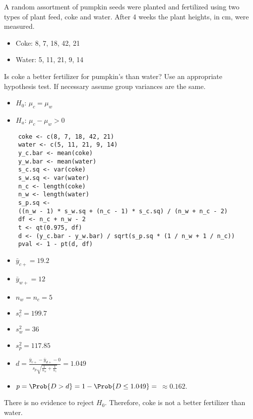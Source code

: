 \begin{Example}{}{}
    A random assortment of pumpkin seeds were planted and fertilized using two types of plant
    feed, coke and water. After 4 weeks the plant heights, in cm, were measured.
    \begin{itemize}
        \item Coke: 8, 7, 18, 42, 21
        \item Water: 5, 11, 21, 9, 14
    \end{itemize}
    Is coke a better fertilizer for pumpkin’s than water? Use an appropriate hypothesis test. If
    necessary assume group variances are the same.
    \begin{itemize}
        \item $ H_0 $: $ \mu_c=\mu_w $
        \item $ H_a $: $ \mu_c-\mu_w>0 $
    \end{itemize}
    \begin{verbatim}
    coke <- c(8, 7, 18, 42, 21)
    water <- c(5, 11, 21, 9, 14)
    y_c.bar <- mean(coke)
    y_w.bar <- mean(water)
    s_c.sq <- var(coke)
    s_w.sq <- var(water)
    n_c <- length(coke)
    n_w <- length(water)
    s_p.sq <-
    ((n_w - 1) * s_w.sq + (n_c - 1) * s_c.sq) / (n_w + n_c - 2)
    df <- n_c + n_w - 2
    t <- qt(0.975, df)
    d <- (y_c.bar - y_w.bar) / sqrt(s_p.sq * (1 / n_w + 1 / n_c))
    pval <- 1 - pt(d, df)
    \end{verbatim}
    \begin{itemize}
        \item $ \bar{y}_{c+}=19.2 $
        \item $ \bar{y}_{w+}=12 $
        \item $ n_w=n_c=5 $
        \item $ s_c^2=199.7 $
        \item $ s_w^2=36 $
        \item $ s_p^2=117.85 $
        \item $ \displaystyle d=\frac{\bar{y}_{c+}-\bar{y}_{d+}-0}{s_p\sqrt{\frac{1}{n_w} +\frac{1}{n_c} }}=1.049 $
        \item $ p=\Prob{D>d}=1-\Prob{D\le 1.049}=$  $\approx 0.162$.
    \end{itemize}
    There is no evidence to reject $ H_0 $. Therefore, coke is not a
    better fertilizer than water.
\end{Example}

